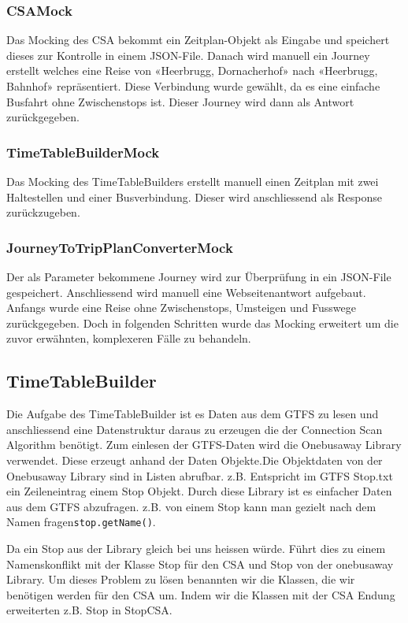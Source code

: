 \subsubsection{CSAMock}
Das Mocking des CSA bekommt ein Zeitplan-Objekt als Eingabe und speichert dieses zur Kontrolle in einem JSON-File. Danach wird manuell ein Journey erstellt welches eine Reise von «Heerbrugg, Dornacherhof» nach «Heerbrugg, Bahnhof» repräsentiert. Diese Verbindung wurde gewählt, da es eine einfache Busfahrt ohne Zwischenstops ist. Dieser Journey wird dann als Antwort zurückgegeben.

\subsubsection{TimeTableBuilderMock}
Das Mocking des TimeTableBuilders erstellt manuell einen Zeitplan mit zwei Haltestellen und einer Busverbindung. Dieser wird anschliessend als Response zurückzugeben.

\subsubsection{JourneyToTripPlanConverterMock}
Der als Parameter bekommene Journey wird zur Überprüfung in ein JSON-File gespeichert. Anschliessend wird manuell eine Webseitenantwort aufgebaut. Anfangs wurde eine Reise ohne Zwischenstops, Umsteigen und Fusswege zurückgegeben. Doch in folgenden Schritten wurde das Mocking erweitert um die zuvor erwähnten, komplexeren Fälle zu behandeln.

\subsection{TimeTableBuilder}
Die Aufgabe des TimeTableBuilder ist es Daten aus dem GTFS zu lesen und anschliessend eine Datenstruktur daraus zu erzeugen die der Connection Scan Algorithm benötigt. Zum einlesen der GTFS-Daten wird die Onebusaway Library verwendet. Diese erzeugt anhand der Daten Objekte.Die Objektdaten von der Onebusaway Library sind in Listen abrufbar.
z.B. Entspricht im GTFS Stop.txt ein Zeileneintrag einem Stop Objekt. Durch diese Library ist es einfacher Daten aus dem GTFS abzufragen. z.B. von einem Stop kann man gezielt nach dem Namen fragen\texttt{stop.getName()}.\newline  

Da ein Stop aus der Library gleich bei uns heissen würde. Führt dies zu einem Namenskonflikt mit der Klasse Stop für den CSA und Stop von der onebusaway Library. Um dieses Problem zu lösen benannten wir die Klassen, die wir benötigen werden für den CSA um. Indem wir die Klassen mit der CSA Endung erweiterten z.B. Stop in StopCSA.\newline

